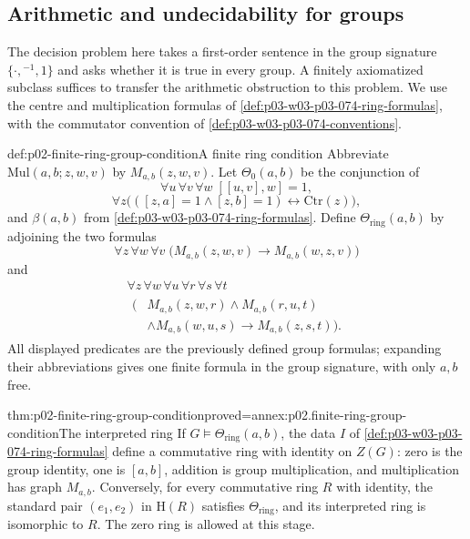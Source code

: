 \subsection{Arithmetic and undecidability for groups}
\label{sec:p02-group-theory-undecidability}

The decision problem here takes a first-order sentence in the group
signature \(\{\cdot,{}^{-1},1\}\) and asks whether it is true in every
group. A finitely axiomatized subclass suffices to transfer the arithmetic
obstruction to this problem. We use the centre and multiplication formulas
of \cref{def:p03-w03-p03-074-ring-formulas}, with the commutator convention
of \cref{def:p03-w03-p03-074-conventions}.

\begin{hbdefinition}{def:p02-finite-ring-group-condition}{A finite ring condition}
Abbreviate \(\mathrm{Mul}(a,b;z,w,v)\) by \(M_{a,b}(z,w,v)\).
Let \(\Theta_0(a,b)\) be the conjunction of
\[
 \forall u\,\forall v\,\forall w\;[[u,v],w]=1,
\]
\[
 \forall z\bigl(([z,a]=1\land[z,b]=1)
                         \leftrightarrow\mathrm{Ctr}(z)\bigr),
\]
and \(\beta(a,b)\) from \cref{def:p03-w03-p03-074-ring-formulas}.
Define \(\Theta_{\mathrm{ring}}(a,b)\) by adjoining the two formulas
\[
 \forall z\,\forall w\,\forall v\;
   \bigl(M_{a,b}(z,w,v)\to M_{a,b}(w,z,v)\bigr)
\]
and
\[
 \begin{gathered}
 \forall z\,\forall w\,\forall u\,\forall r\,\forall s\,\forall t\\
 \begin{aligned}
 \bigl(&M_{a,b}(z,w,r)\land M_{a,b}(r,u,t)\\
       &\land M_{a,b}(w,u,s)\longrightarrow M_{a,b}(z,s,t)\bigr).
 \end{aligned}
 \end{gathered}
\]
All displayed predicates are the previously defined group formulas;
expanding their abbreviations gives one finite formula in the group
signature, with only \(a,b\) free.
\end{hbdefinition}

\begin{hblemma}{thm:p02-finite-ring-group-condition}{proved=annex:p02.finite-ring-group-condition}{The interpreted ring}
If \(G\models\Theta_{\mathrm{ring}}(a,b)\), the data \(I\) of
\cref{def:p03-w03-p03-074-ring-formulas} define a commutative ring with
identity on \(Z(G)\): zero is the group identity, one is \([a,b]\),
addition is group multiplication, and multiplication has graph
\(M_{a,b}\). Conversely, for every commutative ring \(R\) with identity,
the standard pair \((e_1,e_2)\) in \(\mathrm H(R)\) satisfies
\(\Theta_{\mathrm{ring}}\), and its interpreted ring is isomorphic to
\(R\). The zero ring is allowed at this stage.
\end{hblemma}

